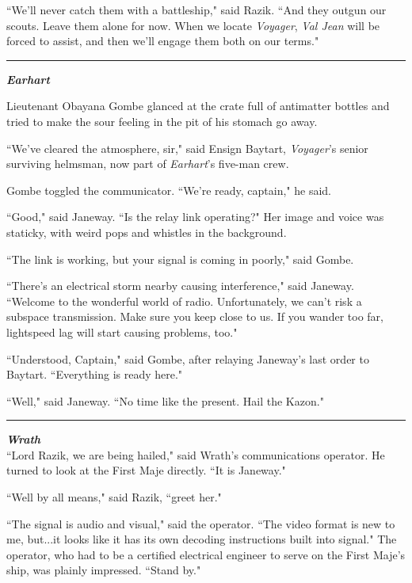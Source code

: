 \documentclass[twoside,letterpaper,12pt]{memoir}
\begin{document}
``We'll never catch them with a battleship," said Razik. ``And they outgun our scouts. Leave them alone for now. When we locate \textit{Voyager}, \textit{Val Jean} will be forced to assist, and then we'll engage them both on our terms."

\begin{center}\rule{3cm}{0.4 pt}\end{center}

\textit{\textbf{Earhart}}

Lieutenant Obayana Gombe glanced at the crate full of antimatter bottles and tried to make the sour feeling in the pit of his stomach go away.

``We've cleared the atmosphere, sir," said Ensign Baytart, \textit{Voyager}'s senior surviving helmsman, now part of \textit{Earhart}'s five-man crew.

Gombe toggled the communicator. ``We're ready, captain," he said.

``Good," said Janeway. ``Is the relay link operating?" Her image and voice was staticky, with weird pops and whistles in the background.

``The link is working, but your signal is coming in poorly," said Gombe.

``There's an electrical storm nearby causing interference," said Janeway. ``Welcome to the wonderful world of radio. Unfortunately, we can't risk a subspace transmission. Make sure you keep close to us. If you wander too far, lightspeed lag will start causing problems, too."

``Understood, Captain," said Gombe, after relaying Janeway's last order to Baytart. ``Everything is ready here."

``Well," said Janeway. ``No time like the present. Hail the Kazon."

\begin{center}\rule{3cm}{0.4 pt}\end{center}

\noindent\textit{\textbf{Wrath}}\\

``Lord Razik, we are being hailed," said Wrath's communications operator. He turned to look at the First Maje directly. ``It is Janeway."

``Well by all means," said Razik, ``greet her."

``The signal is audio and visual," said the operator. ``The video format is new to me, but...it looks like it has its own decoding instructions built into signal." The operator, who had to be a certified electrical engineer to serve on the First Maje's ship, was plainly impressed. ``Stand by."
\end{document}
